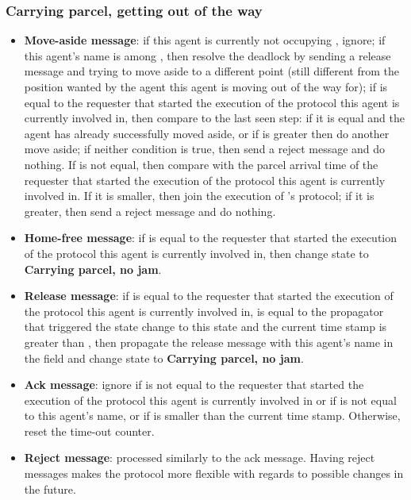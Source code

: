 \subsubsection*{Carrying parcel, getting out of the way}
\begin{itemize}
    \item \textbf{Move-aside message}: if this agent is currently not occupying , ignore; if this agent's name is among , then resolve the deadlock by sending a release message and trying to move aside to a different point (still different from the position wanted by the agent this agent is moving out of the way for); if  is equal to the requester that started the execution of the protocol this agent is currently involved in, then compare  to the last seen step: if it is equal and the agent has already successfully moved aside, or if  is greater then do another move aside; if neither condition is true, then send a reject message and do nothing. If  is not equal, then compare  with the parcel arrival time of the requester that started the execution of the protocol this agent is currently involved in. If it is smaller, then join the execution of 's protocol; if it is greater, then send a reject message and do nothing.
    \item \textbf{Home-free message}: if  is equal to the requester that started the execution of the protocol this agent is currently involved in, then change state to \textbf{Carrying parcel, no jam}.
    \item \textbf{Release message}: if  is equal to the requester that started the execution of the protocol this agent is currently involved in,  is equal to the propagator that triggered the state change to this state and the current time stamp is greater than , then propagate the release message with this agent's name in the  field and change state to \textbf{Carrying parcel, no jam}.
    \item \textbf{Ack message}: ignore if  is not equal to the requester that started the execution of the protocol this agent is currently involved in or if  is not equal to this agent's name, or if  is smaller than the current time stamp. Otherwise, reset the time-out counter.
    \item \textbf{Reject message}: processed similarly to the ack message. Having reject messages makes the protocol more flexible with regards to possible changes in the future.

\end{itemize}

